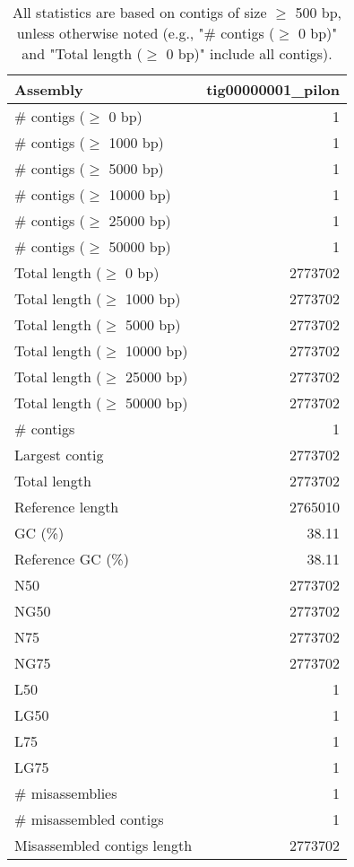 \documentclass[12pt,a4paper]{article}
\begin{document}
\begin{table}[ht]
\begin{center}
\caption{All statistics are based on contigs of size $\geq$ 500 bp, unless otherwise noted (e.g., "\# contigs ($\geq$ 0 bp)" and "Total length ($\geq$ 0 bp)" include all contigs).}
\begin{tabular}{|l*{1}{|r}|}
\hline
Assembly & tig00000001\_pilon \\ \hline
\# contigs ($\geq$ 0 bp) & 1 \\ \hline
\# contigs ($\geq$ 1000 bp) & 1 \\ \hline
\# contigs ($\geq$ 5000 bp) & 1 \\ \hline
\# contigs ($\geq$ 10000 bp) & 1 \\ \hline
\# contigs ($\geq$ 25000 bp) & 1 \\ \hline
\# contigs ($\geq$ 50000 bp) & 1 \\ \hline
Total length ($\geq$ 0 bp) & 2773702 \\ \hline
Total length ($\geq$ 1000 bp) & 2773702 \\ \hline
Total length ($\geq$ 5000 bp) & 2773702 \\ \hline
Total length ($\geq$ 10000 bp) & 2773702 \\ \hline
Total length ($\geq$ 25000 bp) & 2773702 \\ \hline
Total length ($\geq$ 50000 bp) & 2773702 \\ \hline
\# contigs & 1 \\ \hline
Largest contig & 2773702 \\ \hline
Total length & 2773702 \\ \hline
Reference length & 2765010 \\ \hline
GC (\%) & 38.11 \\ \hline
Reference GC (\%) & 38.11 \\ \hline
N50 & 2773702 \\ \hline
NG50 & 2773702 \\ \hline
N75 & 2773702 \\ \hline
NG75 & 2773702 \\ \hline
L50 & 1 \\ \hline
LG50 & 1 \\ \hline
L75 & 1 \\ \hline
LG75 & 1 \\ \hline
\# misassemblies & 1 \\ \hline
\# misassembled contigs & 1 \\ \hline
Misassembled contigs length & 2773702 \\ \hline

\end{tabular}
\end{center}
\end{table}
\end{document}
